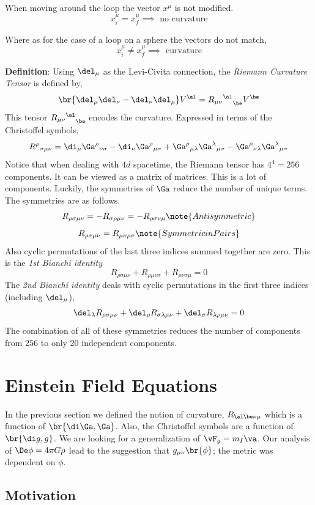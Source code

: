 \documentclass{article}
\begin{document}
When moving around the loop the vector $x^\mu$ is not modified.
\[ x^\mu_i = x^\mu_f \implies \text{ no curvature} \]

Where as for the case of a loop on a sphere the vectors do not match,
\[ x^\mu_i \neq x^\mu_f \implies \text{ curvature} \]

\textbf{Definition}: Using $\del_\mu$ as the Levi-Civita connection, the \textit{Riemann Curvature Tensor} is defined by,
\[ \br{\del_\mu \del_\nu - \del_\nu \del_\mu} V^\al = {{R_{\mu\nu}}^\al}_\be V^\be \]
This tensor ${{R_{\mu\nu}}^\al}_\be$ encodes the curvature. Expressed in terms of the Christoffel symbols,
\[ {R^{\rho}}_{\sigma \mu \nu} = \di_\mu {\Ga^\rho}_{\nu\sigma}- \di_\nu {\Ga^\rho}_{\mu\sigma} + {\Ga^\rho}_{\mu\lambda}{\Ga^\lambda}_{\mu\sigma} - {\Ga^\rho}_{\nu\lambda}{\Ga^\lambda}_{\mu\sigma} \]
Notice that when dealing with $4d$ spacetime, the Riemann tensor has $4^4 = 256$ components. It can be viewed as a matrix of matrices. This is a lot of components. Luckily, the symmetries of $\Ga$ reduce the number of unique terms. The symmetries are as follows.
\[ R_{\rho \sigma \mu \nu} = - R_{\sigma \rho \mu \nu} = - R_{\rho \sigma \nu \mu} \note{Antisymmetric} \]
\[ R_{\rho \sigma \mu \nu} = R_{\mu \nu \rho \sigma } \note{Symmetric in Pairs} \]
Also cyclic permutations of the last three indices summed together are zero. This is the \textit{1st Bianchi identity}
\[ R_{\rho \sigma \mu \nu} + R_{\rho  \mu \nu\sigma} + R_{\rho  \nu\sigma \mu} = 0 \]
The \textit{2nd Bianchi identity} deals with cyclic permutations in the first three indices (including $\del_\mu$),
\[ \del_\lambda R_{\rho \sigma \mu \nu} + \del_\rho R_{ \sigma\lambda \mu \nu} + \del_\sigma R_{\lambda\rho  \mu \nu} = 0 \]
The combination of all of these symmetries reduces the number of components from $256$ to only $20$ independent components.

\section{Einstein Field Equations}

In the previous section we defined the notion of curvature, $R_{\al\be\nu\mu}$ which is a function of $\br{\di \Ga , \Ga}$. Also, the Christoffel symbols are a function of $\br{\di g, g}$. We are looking for a generalization of $\vF_g = m_I \va$. Our analysis of $\De \phi = 4 \pi G \rho$ lead to the suggestion that $g_{\mu\nu}\br{\phi}$; the metric was dependent on $\phi$.

\subsection{Motivation}
\end{document}
